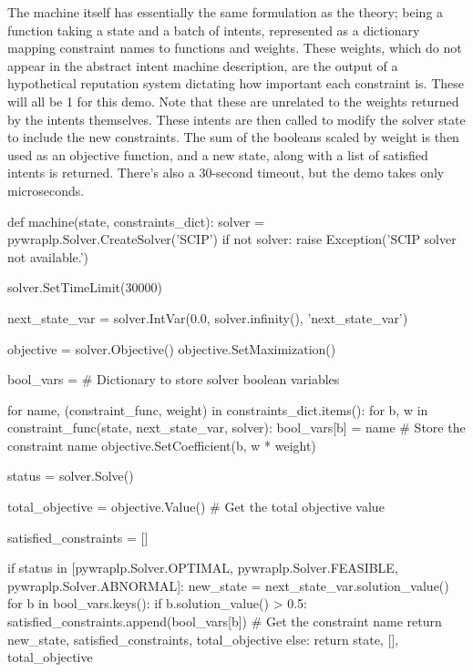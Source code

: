 The machine itself has essentially the same formulation as the theory; being a function taking a state and a batch of intents, represented as a dictionary mapping constraint names to functions and weights. These weights, which do not appear in the abstract intent machine description, are the output of a hypothetical reputation system dictating how important each constraint is. These will all be 1 for this demo. Note that these are unrelated to the weights returned by the intents themselves. These intents are then called to modify the solver state to include the new constraints. The sum of the booleans scaled by weight is then used as an objective function, and a new state, along with a list of satisfied intents is returned. There's also a 30-second timeout, but the demo takes only microseconds.

\begin{betterpython}
    def machine(state, constraints_dict):
        solver = pywraplp.Solver.CreateSolver('SCIP')
        if not solver:
            raise Exception('SCIP solver not available.')
        
        solver.SetTimeLimit(30000)
        
        next_state_var = solver.IntVar(0.0, solver.infinity(), 'next_state_var')
        
        objective = solver.Objective()
        objective.SetMaximization()
        
        bool_vars = {}  # Dictionary to store solver boolean variables
        
        for name, (constraint_func, weight) in constraints_dict.items():
            for b, w in constraint_func(state, next_state_var, solver):
                bool_vars[b] = name  # Store the constraint name
                objective.SetCoefficient(b, w * weight)
        
        status = solver.Solve()
        
        total_objective = objective.Value()  # Get the total objective value
        
        satisfied_constraints = []
        
        if status in [pywraplp.Solver.OPTIMAL, pywraplp.Solver.FEASIBLE, pywraplp.Solver.ABNORMAL]:
            new_state = next_state_var.solution_value()
            for b in bool_vars.keys():
                if b.solution_value() > 0.5:
                    satisfied_constraints.append(bool_vars[b])  # Get the constraint name
            return new_state, satisfied_constraints, total_objective
        else:
            return state, [], total_objective
\end{betterpython}

